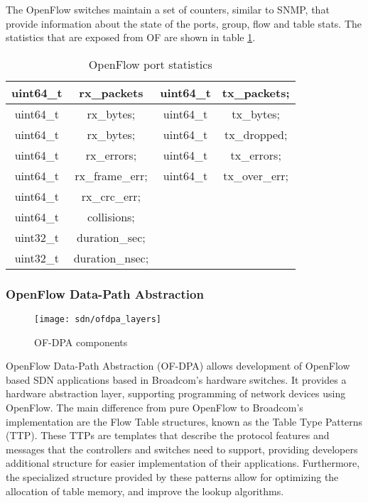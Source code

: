 \begin {enumerate}
The OpenFlow switches maintain a set of counters, similar to SNMP, that provide information about the state of the ports, group, flow and table stats. The
statistics that are exposed from OF are shown in table \ref{tab:of_port_stats}.

\begin{table}[H]
    \centering
    \caption{OpenFlow port statistics}
    \begin{tabular}{c | c || c | c}
       uint64\_t & rx\_packets     & uint64\_t & tx\_packets;     \\ \hline
       uint64\_t & rx\_bytes;      & uint64\_t & tx\_bytes;       \\ \hline
       uint64\_t & rx\_bytes;      & uint64\_t & tx\_dropped;     \\ \hline
       uint64\_t & rx\_errors;     & uint64\_t & tx\_errors;      \\ \hline
       uint64\_t & rx\_frame\_err; & uint64\_t & tx\_over\_err;   \\ \hline
       uint64\_t & rx\_crc\_err;   &                              \\ \hline
       uint64\_t & collisions;     &                              \\ \hline
       uint32\_t & duration\_sec;  &                              \\ \hline
       uint32\_t & duration\_nsec; &                 
    \label{tab:of_port_stats}
    \end{tabular}
\end{table}

\subsubsection{OpenFlow Data-Path Abstraction} \label{sec:ofdpa}

\begin{figure}[H]
    \centering
    \texttt{[image: sdn/ofdpa\_layers]}
    \caption{OF-DPA components \cite{broadcom_corporation_openflow_2017}}
    \label{fig:ofdpa_struct}
\end{figure}

OpenFlow Data-Path Abstraction (OF-DPA) allows development of OpenFlow based SDN applications based in Broadcom's hardware switches. It provides a hardware 
abstraction layer, supporting programming of network devices using OpenFlow. The main difference from pure OpenFlow to Broadcom's implementation are the Flow
Table structures, known as the Table Type Patterns (TTP). These TTPs are templates that describe the protocol features and messages that the controllers and switches
need to support, providing developers additional structure for easier implementation of their applications. Furthermore, the specialized structure provided by these
patterns allow for optimizing the allocation of table memory, and improve the lookup algorithms.


\end{enumerate}
